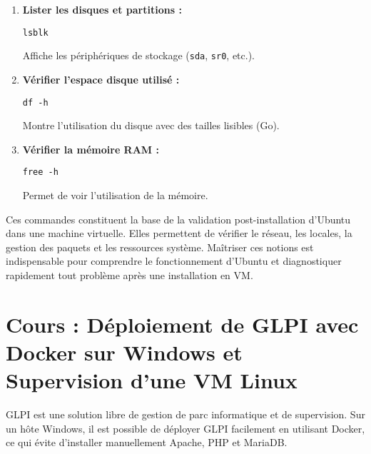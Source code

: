 \documentclass[11pt,a4paper]{article}
\begin{document}
\begin{tcolorbox}[title={5. Vérification du disque et du système}]
\begin{enumerate}
  \item \textbf{Lister les disques et partitions :}
\begin{verbatim}
lsblk
\end{verbatim}
Affiche les périphériques de stockage (\texttt{sda}, \texttt{sr0}, etc.).

  \item \textbf{Vérifier l’espace disque utilisé :}
\begin{verbatim}
df -h
\end{verbatim}
Montre l’utilisation du disque avec des tailles lisibles (Go).

  \item \textbf{Vérifier la mémoire RAM :}
\begin{verbatim}
free -h
\end{verbatim}
Permet de voir l’utilisation de la mémoire.
\end{enumerate}
\end{tcolorbox}




\begin{tcolorbox}[title={Conclusion}]
Ces commandes constituent la base de la validation post-installation d’Ubuntu dans une machine virtuelle.  
Elles permettent de vérifier le réseau, les locales, la gestion des paquets et les ressources système.  
Maîtriser ces notions est indispensable pour comprendre le fonctionnement d’Ubuntu et diagnostiquer rapidement tout problème après une installation en VM.
\end{tcolorbox}




\section{Cours : Déploiement de GLPI avec Docker sur Windows et Supervision d’une VM Linux}


\begin{tcolorbox}[title={Introduction}]
GLPI est une solution libre de gestion de parc informatique et de supervision.  
Sur un hôte Windows, il est possible de déployer GLPI facilement en utilisant Docker, ce qui évite d’installer manuellement Apache, PHP et MariaDB.  
\end{tcolorbox}
\end{document}
